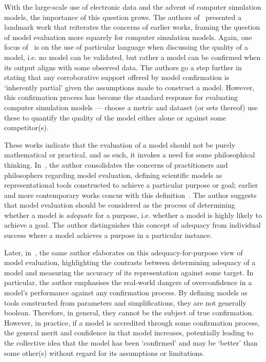With the large-scale use of electronic data and the advent of computer
simulation models, the importance of this question grows. The authors
of~\cite{Oreskes1994} presented a landmark work that reiterates the concerns of
earlier works, framing the question of model evaluation more squarely for
computer simulation models. Again, one focus of~\cite{Oreskes1994} is on the use
of particular language when discussing the quality of a model, i.e. no model can
be validated, but rather a model can be confirmed when its output aligns with
some observed data. The authors go a step further in stating that any
corroborative support offered by model confirmation is `inherently partial'
given the assumptions made to construct a model. However, this confirmation
process has become the standard response for evaluating computer simulation
models --- choose a metric and dataset (or sets thereof) use these to quantify
the quality of the model either alone or against some competitor(s).

These works indicate that the evaluation of a model should not be purely
mathematical or practical, and as such, it invokes a need for some philosophical
thinking. In~\cite{Parker2010}, the author consolidates the concerns of
practitioners and philosophers regarding model evaluation, defining scientific
models as representational tools constructed to achieve a particular purpose or
goal; earlier and more contemporary works concur with this
definition~\cite{Baumberger2017,Caswell1976,Currie2017}. The author suggests
that model evaluation should be considered as the process of determining whether
a model is \emph{adequate} for a purpose, i.e. whether a model is highly likely
to achieve a goal. The author distinguishes this concept of adequacy from
individual success where a model achieves a purpose in a particular instance.

Later, in~\cite{Parker2020}, the same author elaborates on this
adequacy-for-purpose view of model evaluation, highlighting the contrasts
between determining adequacy of a model and measuring the accuracy of its
representation against some target. In particular, the author emphasises the
real-world dangers of overconfidence in a model's performance against any
confirmation process. By defining models as tools constructed from parameters
and simplifications, they are not generally boolean. Therefore, in general, they
cannot be the subject of true confirmation. However, in practice, if a model is
accredited through some confirmation process, the general merit and confidence
in that model increases, potentially leading to the collective idea that the
model has been `confirmed' and may be `better' than some other(s) without regard
for its assumptions or limitations.

